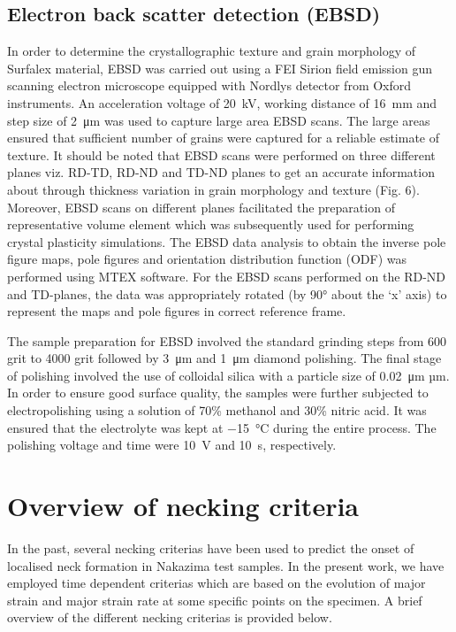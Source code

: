 \documentclass[11pt]{article} %
\begin{document}
\subsection{Electron back scatter detection (EBSD)}
In order to determine the crystallographic texture and grain morphology of Surfalex material, EBSD was carried out using a FEI Sirion field emission gun scanning electron microscope equipped with Nordlys detector from Oxford instruments. An acceleration voltage of \SI{20}{\kilo\volt}, working distance of \SI{16}{\milli\meter} and step size of \SI{2}{\micro\meter} was used to capture large area EBSD scans. The large areas ensured that sufficient number of grains were captured for a reliable estimate of texture. It should be noted that EBSD scans were performed on three different planes viz. RD-TD, RD-ND and TD-ND planes to get an accurate information about through thickness variation in grain morphology and texture (Fig. 6). Moreover, EBSD scans on different planes facilitated the preparation of representative volume element which was subsequently used for performing crystal plasticity simulations. The EBSD data analysis to obtain the inverse pole figure maps, pole figures and orientation distribution function (ODF) was performed using MTEX software. For the EBSD scans performed on the RD-ND and TD-planes, the data was appropriately rotated (by \ang{90} about the ‘x’ axis) to represent the maps and pole figures in correct reference frame. 


The sample preparation for EBSD involved the standard grinding steps from 600 grit to 4000 grit followed by \SI{3}{\micro\meter} and \SI{1}{\micro\meter} diamond polishing. The final stage of polishing involved the use of colloidal silica with a particle size of \SI{0.02}{\micro\meter} µm. In order to ensure good surface quality, the samples were further subjected to electropolishing using a solution of 70\% methanol and 30\% nitric acid. It was ensured that the electrolyte was kept at \SI{-15}{\celsius} during the entire process. The polishing voltage and time were \SI{10}{\volt} and \SI{10}{\second}, respectively. 

\section{Overview of necking criteria}
In the past, several necking criterias have been used to predict the onset of localised neck formation in Nakazima test samples. In the present work, we have employed time dependent criterias which are based on the evolution of major strain and major strain rate at some specific points on the specimen. A brief overview of the different necking criterias is provided below.
\end{document}
